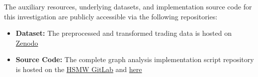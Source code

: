 \documentclass[language=english,thesis=bachelor,nosecondtitle,faculty=cb,onesided,12pt]{hsmw-thesis}
\begin{document}
\appendix %
\thispagestyle{plain}
The auxiliary resources, underlying datasets, and implementation source code for this investigation are publicly accessible via the following repositories:

\begin{itemize}
    \item \textbf{Dataset:} The preprocessed and transformed trading data is hosted on  \href{https://zenodo.org/records/4540223}{Zenodo}
    \item \textbf{Source Code:} The complete graph analysis implementation script repository is hosted on the \href{https://git.hs-mittweida.de/frafique/preliminary-investigation-of-wash-trading-detection-on-etherdelta-using-graph-based-methods.git}{HSMW GitLab}  and  \href{https://git.hs-mittweida.de/frafique/preliminary-investigation-of-wash-trading-detection-on-etherdelta-using-graph-based-methods.git}{here}
\end{itemize}
\end{document}
